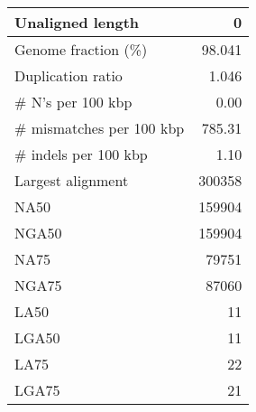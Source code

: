 \documentclass[12pt,a4paper]{article}
\begin{document}
\begin{table}[ht]
\begin{center}
\begin{tabular}{|l*{1}{|r}|}
Unaligned length & 0 \\ \hline
Genome fraction (\%) & 98.041 \\ \hline
Duplication ratio & 1.046 \\ \hline
\# N's per 100 kbp & 0.00 \\ \hline
\# mismatches per 100 kbp & 785.31 \\ \hline
\# indels per 100 kbp & 1.10 \\ \hline
Largest alignment & 300358 \\ \hline
NA50 & 159904 \\ \hline
NGA50 & 159904 \\ \hline
NA75 & 79751 \\ \hline
NGA75 & 87060 \\ \hline
LA50 & 11 \\ \hline
LGA50 & 11 \\ \hline
LA75 & 22 \\ \hline
LGA75 & 21 \\ \hline
\end{tabular}
\end{center}
\end{table}
\end{document}

